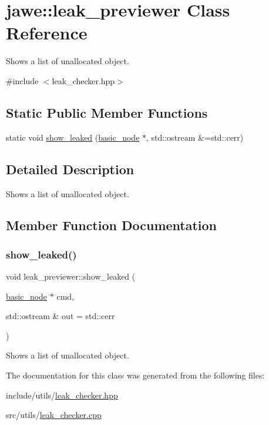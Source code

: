 \hypertarget{classjawe_1_1leak__previewer}{}\section{jawe\+:\+:leak\+\_\+previewer Class Reference}
\label{classjawe_1_1leak__previewer}


Shows a list of unallocated object.  




{\ttfamily \#include $<$leak\+\_\+checker.\+hpp$>$}

\subsection*{Static Public Member Functions}
\begin{DoxyCompactItemize}
\item 
static void \hyperlink{classjawe_1_1leak__previewer_a2d1a6c3b504915c92136ce38620f302f}{show\+\_\+leaked} (\hyperlink{classjawe_1_1basic__node}{basic\+\_\+node} $\ast$, std\+::ostream \&=std\+::cerr)
\end{DoxyCompactItemize}


\subsection{Detailed Description}
Shows a list of unallocated object. 

\subsection{Member Function Documentation}
\mbox{\label{classjawe_1_1leak__previewer_a2d1a6c3b504915c92136ce38620f302f}} 
\subsubsection{\texorpdfstring{show\+\_\+leaked()}{show\_leaked()}}
{\footnotesize\ttfamily void leak\+\_\+previewer\+::show\+\_\+leaked (\begin{DoxyParamCaption}\item[{\hyperlink{classjawe_1_1basic__node}{basic\+\_\+node} $\ast$}]{cmd,  }\item[{std\+::ostream \&}]{out = {\ttfamily std\+:\+:cerr} }\end{DoxyParamCaption})\hspace{0.3cm}{\ttfamily [static]}}

Shows a list of unallocated object. 

The documentation for this class was generated from the following files\+:\begin{DoxyCompactItemize}
\item 
include/utils/\hyperlink{leak__checker_8hpp}{leak\+\_\+checker.\+hpp}\item 
src/utils/\hyperlink{leak__checker_8cpp}{leak\+\_\+checker.\+cpp}\end{DoxyCompactItemize}
